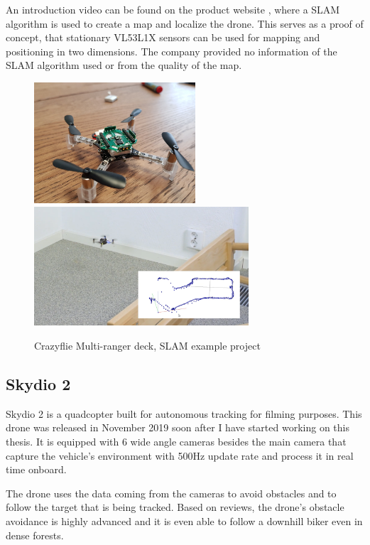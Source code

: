 An introduction video can be found on the product website \cite{BitcrazeMultirangerDeck}, where 
a SLAM algorithm is used to create a map and localize the drone. This serves as a proof of concept,
that stationary VL53L1X sensors can be used for mapping and positioning in two dimensions. The company provided 
no information of the SLAM algorithm used or from the quality of the map.
\newpage
\begin{figure}[h]
    \centering
    \includegraphics[width=60mm, keepaspectratio]{figures/multiranger_deck.jpg}
    \includegraphics[width=80mm, keepaspectratio]{figures/multiranger_slam.png}
    \caption{Crazyflie Multi-ranger deck, SLAM example project}
    \label{fig:crazyflie_multiranger}
\end{figure}



\subsection{Skydio 2}
Skydio 2 is a quadcopter built for autonomous tracking for filming purposes. This drone was released 
in November 2019 soon after I have started working on this thesis. It is equipped with 6 wide angle 
cameras besides the main camera that capture the vehicle's environment with 500Hz update rate and 
process it in real time onboard. \cite{SkydioWebsite}

The drone uses the data coming from the cameras to avoid obstacles and to follow the target that is 
being tracked. Based on reviews, the drone's obstacle avoidance is highly advanced and it is even able 
to follow a downhill biker even in dense forests. 

